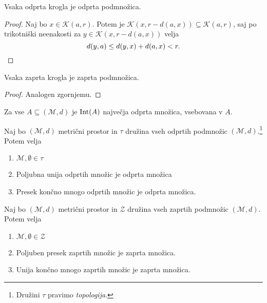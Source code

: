 \documentclass[12pt, a4paper]{article}
\begin{document}
\begin{trditev}
Vsaka odprta krogla je odprta podmnožica.
\end{trditev}

\begin{proof}
Naj bo $x\in\mathcal{K}(a,r)$. Potem je $\mathcal{K}(x,r-d(a,x))\subseteq\mathcal{K}(a,r)$, saj po trikotniški neenakosti za $y\in\mathcal{K}(x,r-d(a,x))$ velja
\[
d(y,a)\leq d(y,x)+d(a,x)<r.\qedhere
\]
\end{proof}

\begin{trditev}
Vsaka zaprta krogla je zaprta podmnožica.
\end{trditev}

\begin{proof}
Analogen zgornjemu.
\end{proof}

\begin{opomba}
Za vse $A\subseteq(\mathcal{M},d)$ je $\operatorname{Int}(A)$ največja odprta množica, vsebovana v $A$.
\end{opomba}

\begin{izrek}[Topologija]
Naj bo $(\mathcal{M},d)$ metrični prostor in $\tau$ družina vseh odprtih podmnožic $(\mathcal{M},d)$.\footnote{Družini $\tau$ pravimo \emph{topologija}.} Potem velja

\begin{enumerate}[label=\roman*)]
\item $\mathcal{M},\emptyset\in\tau$
\item Poljubna unija odprtih množic je odprta množica
\item Presek končno mnogo odprtih množic je odprta množica.
\end{enumerate}
\end{izrek}

\obvs

\begin{posledica}
Naj bo $(\mathcal{M},d)$ metrični prostor in $\mathcal{Z}$ družina vseh zaprtih podmnožic $(\mathcal{M},d)$. Potem velja

\begin{enumerate}[label=\roman*)]
\item $\mathcal{M},\emptyset\in\mathcal{Z}$
\item Poljuben presek zaprtih množic je zaprta množica.
\item Unija končno mnogo zaprtih množic je zaprta množica.
\end{enumerate}
\end{posledica}
\end{document}
